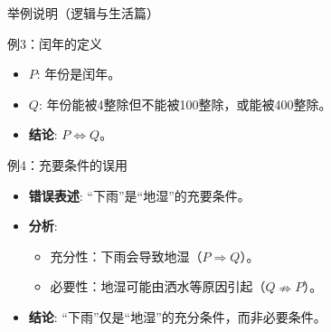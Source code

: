 \documentclass[UTF8]{beamer}
\begin{document}
\begin{frame}{举例说明（逻辑与生活篇）}
  \begin{exampleblock}{例3：闰年的定义}
    \begin{itemize}
      \item \( P \): 年份是闰年。
      \item \( Q \): 年份能被4整除但不能被100整除，或能被400整除。
      \item \textbf{结论}: \( P \Leftrightarrow Q \)。
    \end{itemize}
  \end{exampleblock}
  
  \begin{alertblock}{例4：充要条件的误用}
    \begin{itemize}
      \item \textbf{错误表述}: “下雨”是“地湿”的充要条件。
      \item \textbf{分析}:
        \begin{itemize}
          \item 充分性：下雨会导致地湿（\( P \Rightarrow Q \)）。
          \item 必要性：地湿可能由洒水等原因引起（\( Q \nRightarrow P \)）。
        \end{itemize}
      \item \textbf{结论}: “下雨”仅是“地湿”的充分条件，而非必要条件。
    \end{itemize}
  \end{alertblock}
\end{frame}

\end{document}
